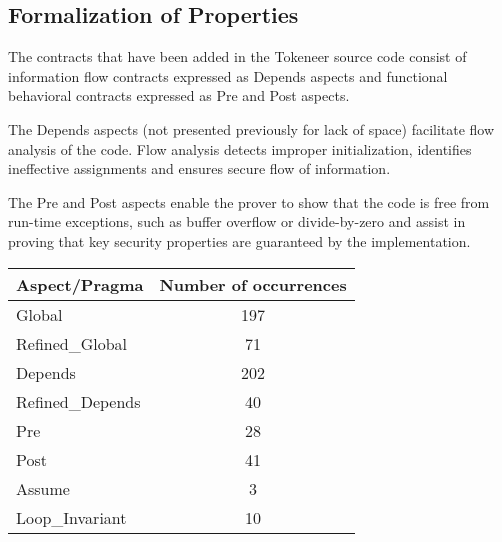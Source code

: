\documentclass[10pt,a4paper,twocolumn]{article}
\newcommand{\oldspark}{SPARK~2005\xspace}
\newcommand{\SPARK}[1]{\lstinline[language=Ada,basicstyle={\footnotesize
      \sffamily},framesep=0pt]$#1$}
\begin{document}





\subsection{Formalization of Properties}

The contracts that have been added in the Tokeneer source code consist of
information flow contracts expressed as Depends aspects and functional
behavioral contracts expressed as Pre and Post aspects.

The Depends aspects (not presented previously for lack of space) facilitate
flow analysis of the code. Flow analysis detects improper initialization,
identifies ineffective assignments and ensures secure flow of information.

The Pre and Post aspects enable the prover to show that the code is
free from run-time exceptions, such as buffer overflow or
divide-by-zero and assist in proving that key security properties are
guaranteed by the implementation.

\begin{tabular}{|l|c|}
\hline
{\bf Aspect/Pragma}       & {\bf Number of occurrences}  \\
\hline
Global              & 197 \\
\hline
Refined\_Global     & 71 \\
\hline
Depends             & 202 \\
\hline
Refined\_Depends    & 40 \\
\hline
Pre                 & 28 \\
\hline
Post                & 41 \\
\hline
Assume              & 3 \\
\hline
Loop\_Invariant     & 10 \\
\hline
\end{tabular}
\end{document}
